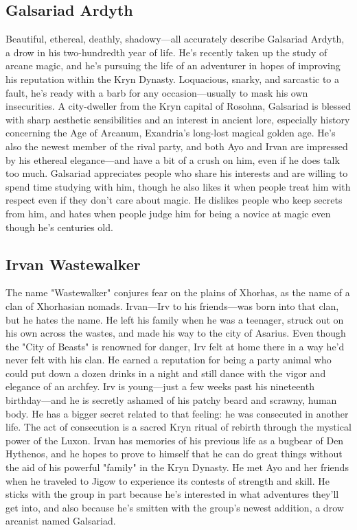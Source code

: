 \documentclass[10pt,a4,twoside,twocolumn,openany,nodeprecatedcode]{dndbook}
\begin{document}
\subsection{Galsariad Ardyth}
Beautiful, ethereal, deathly, shadowy—all accurately describe Galsariad Ardyth, a drow in his two-hundredth year of life. He's recently taken up the study of arcane magic, and he's pursuing the life of an adventurer in hopes of improving his reputation within the Kryn Dynasty. Loquacious, snarky, and sarcastic to a fault, he's ready with a barb for any occasion—usually to mask his own insecurities.
A city-dweller from the Kryn capital of Rosohna, Galsariad is blessed with sharp aesthetic sensibilities and an interest in ancient lore, especially history concerning the Age of Arcanum, Exandria's long-lost magical golden age. He's also the newest member of the rival party, and both Ayo and Irvan are impressed by his ethereal elegance—and have a bit of a crush on him, even if he does talk too much.
Galsariad appreciates people who share his interests and are willing to spend time studying with him, though he also likes it when people treat him with respect even if they don't care about magic. He dislikes people who keep secrets from him, and hates when people judge him for being a novice at magic even though he's centuries old.
\subsection{Irvan Wastewalker}
The name "Wastewalker" conjures fear on the plains of Xhorhas, as the name of a clan of Xhorhasian nomads. Irvan—Irv to his friends—was born into that clan, but he hates the name. He left his family when he was a teenager, struck out on his own across the wastes, and made his way to the city of Asarius. Even though the "City of Beasts" is renowned for danger, Irv felt at home there in a way he'd never felt with his clan.
He earned a reputation for being a party animal who could put down a dozen drinks in a night and still dance with the vigor and elegance of an archfey. Irv is young—just a few weeks past his nineteenth birthday—and he is secretly ashamed of his patchy beard and scrawny, human body. He has a bigger secret related to that feeling: he was consecuted in another life. The act of consecution is a sacred Kryn ritual of rebirth through the mystical power of the Luxon. Irvan has memories of his previous life as a bugbear of Den Hythenos, and he hopes to prove to himself that he can do great things without the aid of his powerful "family" in the Kryn Dynasty.
He met Ayo and her friends when he traveled to Jigow to experience its contests of strength and skill. He sticks with the group in part because he's interested in what adventures they'll get into, and also because he's smitten with the group's newest addition, a drow arcanist named Galsariad.
\end{document}
